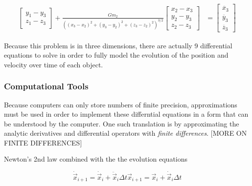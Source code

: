 \documentclass{report}
\begin{document}
\begin{align}
\begin{bmatrix}
                    y_1 - y_3 \\
                    z_1 - z_3
                \end{bmatrix} + 
                \frac{G m_2}{((x_3 - x_2)^2 + (y_3 - y_2)^2 + (z_3 - z_2)^2)^{3/2}} 
                \begin{bmatrix}
                    x_2 - x_3 \\
                    y_2 - y_3 \\
                    z_2 - z_3
                \end{bmatrix} &= \begin{bmatrix}
                    \ddot{x_3} \\
                    \ddot{y_3} \\ 
                    \ddot{z_3}
                \end{bmatrix}
            \end{align}

            Because this problem is in three dimensions, there are actually 9 differential equations to solve in order to fully model the evolution of the position and velocity over time of each object.

        \subsubsection{Computational Tools}

            Because computers can only store numbers of finite precision, approximations must be used in order to implement these differntial equations in a form that can be understood by the computer.  One such translation is by approximating the analytic derivatives and differential operators with \emph{finite differences}. [MORE ON FINITE DIFFERENCES]

            Newton's 2nd law combined with the the evolution equations
            
            \begin{subequations}
                \begin{equation}
                    \dot{\vec{x}}_{i + 1} = \dot{\vec{x}}_i + \ddot{\vec{x}}_i \Delta t
                \end{equation}
                \begin{equation}
                    \vec{x}_{i + 1} = \vec{x}_i + \dot{\vec{x}}_i \Delta t
                \end{equation}
            \end{subequations}
\end{document}
